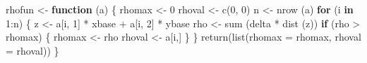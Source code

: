 \documentclass[
  12pt,
]{book}
\newenvironment{Shaded}{\begin{snugshade}}{\end{snugshade}}
\newcommand{\AttributeTok}[1]{\textcolor[rgb]{0.77,0.63,0.00}{#1}}
\newcommand{\ControlFlowTok}[1]{\textcolor[rgb]{0.13,0.29,0.53}{\textbf{#1}}}
\newcommand{\DecValTok}[1]{\textcolor[rgb]{0.00,0.00,0.81}{#1}}
\newcommand{\FunctionTok}[1]{\textcolor[rgb]{0.00,0.00,0.00}{#1}}
\newcommand{\NormalTok}[1]{#1}
\newcommand{\OtherTok}[1]{\textcolor[rgb]{0.56,0.35,0.01}{#1}}
\newcommand{\SpecialCharTok}[1]{\textcolor[rgb]{0.00,0.00,0.00}{#1}}
\theoremstyle{definition}
\theoremstyle{definition}
\theoremstyle{definition}
\theoremstyle{definition}
\theoremstyle{remark}
\begin{document}
\begin{Shaded}
\begin{Highlighting}[]
\NormalTok{rhofun }\OtherTok{\textless{}{-}} \ControlFlowTok{function}\NormalTok{ (a) \{}
\NormalTok{  rhomax }\OtherTok{\textless{}{-}} \DecValTok{0}
\NormalTok{  rhoval }\OtherTok{\textless{}{-}} \FunctionTok{c}\NormalTok{(}\DecValTok{0}\NormalTok{, }\DecValTok{0}\NormalTok{)}
\NormalTok{  n }\OtherTok{\textless{}{-}} \FunctionTok{nrow}\NormalTok{ (a)}
  \ControlFlowTok{for}\NormalTok{ (i }\ControlFlowTok{in} \DecValTok{1}\SpecialCharTok{:}\NormalTok{n) \{}
\NormalTok{    z }\OtherTok{\textless{}{-}}\NormalTok{ a[i, }\DecValTok{1}\NormalTok{] }\SpecialCharTok{*}\NormalTok{ xbase }\SpecialCharTok{+}\NormalTok{ a[i, }\DecValTok{2}\NormalTok{] }\SpecialCharTok{*}\NormalTok{ ybase}
\NormalTok{    rho }\OtherTok{\textless{}{-}} \FunctionTok{sum}\NormalTok{ (delta }\SpecialCharTok{*} \FunctionTok{dist}\NormalTok{ (z))}
    \ControlFlowTok{if}\NormalTok{ (rho }\SpecialCharTok{\textgreater{}}\NormalTok{ rhomax) \{}
\NormalTok{      rhomax }\OtherTok{\textless{}{-}}\NormalTok{ rho}
\NormalTok{      rhoval }\OtherTok{\textless{}{-}}\NormalTok{ a[i,]}
\NormalTok{    \}}
\NormalTok{  \}}
  \FunctionTok{return}\NormalTok{(}\FunctionTok{list}\NormalTok{(}\AttributeTok{rhomax =}\NormalTok{ rhomax, }\AttributeTok{rhoval =}\NormalTok{ rhoval))}
\NormalTok{\}}


\end{Highlighting}
\end{Shaded}
\end{document}
